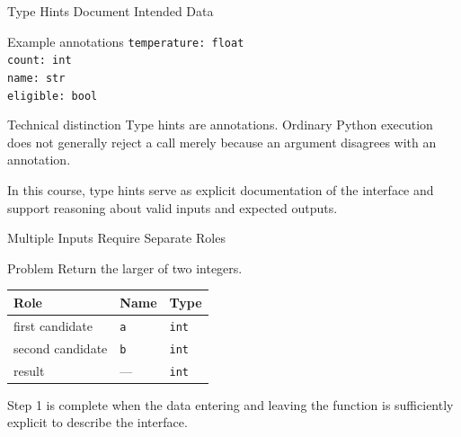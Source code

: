 \documentclass[aspectratio=169,10pt]{beamer}
\begin{document}
\begin{frame}{Type Hints Document Intended Data}
  \begin{block}{Example annotations}
    \texttt{temperature: float}\\
    \texttt{count: int}\\
    \texttt{name: str}\\
    \texttt{eligible: bool}
  \end{block}

  \begin{alertblock}{Technical distinction}
    Type hints are annotations. Ordinary Python execution does not generally reject a call merely because an argument disagrees with an annotation.
  \end{alertblock}

  \begin{keyidea}
    In this course, type hints serve as explicit documentation of the interface and support reasoning about valid inputs and expected outputs.
  \end{keyidea}
\end{frame}

\begin{frame}{Multiple Inputs Require Separate Roles}
  \begin{block}{Problem}
    Return the larger of two integers.
  \end{block}

  \begin{center}
    \renewcommand{\arraystretch}{1.35}
    \begin{tabular}{l|l|l}
      \textbf{Role} & \textbf{Name} & \textbf{Type} \\\hline
      first candidate & \texttt{a} & \texttt{int} \\
      second candidate & \texttt{b} & \texttt{int} \\
      result & --- & \texttt{int}
    \end{tabular}
  \end{center}

  \begin{keyidea}
    Step 1 is complete when the data entering and leaving the function is sufficiently explicit to describe the interface.
  \end{keyidea}
\end{frame}

\end{document}
